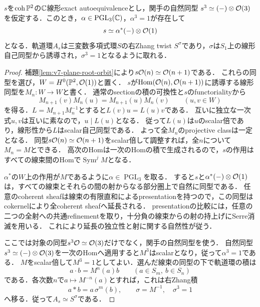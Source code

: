 \documentclass[11pt,a4paper]{ltjsarticle}
\begin{document}
\begin{lemma}[射影平面上の三乗根と線形twist]
\label{lem:v8-plane-root-twist}
$s$を$\operatorname{coh}\mathbb P^2$の$\mathbb C$線形exact autoequivalenceとし，関手の自然同型
$s^3\simeq(-)\otimes\mathcal O(3)$を仮定する．このとき，$\alpha\in\operatorname{PGL}_3(\mathbb C)$，$\alpha^3=1$が存在して
\[
 s\simeq\alpha^*(-)\otimes\mathcal O(1)
\]
となる．軌道環$A_s$は三変数多項式環$S$の右Zhang twist $S^\sigma$であり，$\sigma$は$S_1$上の線形自己同型から誘導され，$\sigma^3=1$となるように取れる．
\end{lemma}
\begin{proof}
補題\ref{lem:v7-plane-root-orbit}により$s\mathcal O(n)\simeq\mathcal O(n+1)$である．
これらの同型を選び，$W=H^0(\mathbb P^2,\mathcal O(1))$と置く．
$s$が$\operatorname{Hom}(\mathcal O(n),\mathcal O(n+1))$に誘導する線形同型を$M_n:W\to W$と書く．
通常のsectionの積の可換性と$s$のfunctorialityから
\[
 M_{n+1}(v)M_n(u)=M_{n+1}(u)M_n(v)\qquad(u,v\in W)
\]
を得る．$L=M_{n+1}M_n^{-1}$とすると$L(v)u=L(u)v$である．
互いに独立な一次式$u,v$は互いに素なので，$u\mid L(u)$となる．
従って$L(u)$は$u$のscalar倍であり，線形性から$L$はscalar自己同型である．
よって全$M_n$のprojective classは一定となる．
同型$s\mathcal O(n)\simeq\mathcal O(n+1)$をscalar倍して調整すれば，全$n$について$M_n=M$とできる．
高次のHomは一次のHomの積で生成されるので，$s$の作用はすべての線束間のHomで$\operatorname{Sym}^jM$となる．

$\alpha^*$の$W$上の作用が$M$であるように$\alpha\in\operatorname{PGL}_3$を取る．
すると$s$と$\alpha^*(-)\otimes\mathcal O(1)$は，すべての線束とそれらの間の射からなる部分圏上で自然に同型である．
任意のcoherent sheafは線束の有限直和によるpresentationを持つので，この同型はcokernelにより全coherent sheafへ延長される．
presentationの比較には，任意の二つの全射への共通refinementを取り，十分負の線束からの射の持上げにSerre消滅を用いる．
これにより延長の独立性と射に関する自然性が従う．

ここでは対象の同型$s^3\mathcal O\simeq\mathcal O(3)$だけでなく，関手の自然同型を使う．
自然同型$s^3\simeq(-)\otimes\mathcal O(3)$を一次のHomへ適用すると$M^3$はscalarとなり，従って$\alpha^3=1$である．
$M$をscalar倍して$M^3=1$としてよい．選んだ線束の同型の下で軌道環の積は
\[
 a\cdot b=M^n(a)b\qquad(a\in S_m,\ b\in S_n)
\]
である．各次数$n$で$a\mapsto M^{-n}(a)$とすれば，これは右Zhang積
\[
 a*b=a\,\sigma^m(b),\qquad\sigma=M^{-1},\quad\sigma^3=1
\]
へ移る．従って$A_s\simeq S^\sigma$である．
\end{proof}
\end{document}
